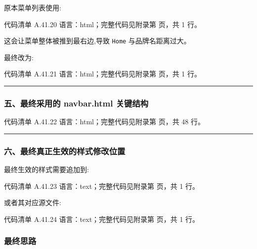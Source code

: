 \documentclass[lang=cn,scheme=chinese,color=blue,device=normal,toc=onecol,math=cm]{elegantbook}
\begin{document}
原本菜单列表使用:\par


\begin{codeindexbox}{代码清单 A.41.20}
语言：html；完整代码见附录第 \pageref{code:41:20} 页，共 1 行。
\end{codeindexbox}


这会让菜单整体被推到最右边,导致 \texttt{Home} 与品牌名距离过大。\par


最终改为:\par


\begin{codeindexbox}{代码清单 A.41.21}
语言：html；完整代码见附录第 \pageref{code:41:21} 页，共 1 行。
\end{codeindexbox}


\medskip\hrule\medskip


\subsubsection{五、最终采用的 navbar.html 关键结构}


\begin{codeindexbox}{代码清单 A.41.22}
语言：html；完整代码见附录第 \pageref{code:41:22} 页，共 48 行。
\end{codeindexbox}


\medskip\hrule\medskip


\subsubsection{六、最终真正生效的样式修改位置}


最终生效的样式需要追加到:\par


\begin{codeindexbox}{代码清单 A.41.23}
语言：text；完整代码见附录第 \pageref{code:41:23} 页，共 1 行。
\end{codeindexbox}


或者其对应源文件:\par


\begin{codeindexbox}{代码清单 A.41.24}
语言：text；完整代码见附录第 \pageref{code:41:24} 页，共 1 行。
\end{codeindexbox}


\subsubsection{最终思路}
\end{document}
